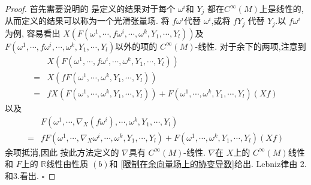 \documentclass[../../几何与拓扑.tex]{subfiles}
\begin{document}
\begin{proof}
    首先需要说明的 是定义的结果对于每个 \(   \omega ^{i}  \)和 \(  Y_{j}  \)  都在\(  C^{\infty}\left( M \right)   \)上是线性的,从而定义的结果可以称为一个光滑张量场.
    将 \(  f \omega ^{i}  \)代替 \(   \omega ^{i}  \),或将 \(  fY_{j}  \)    代替 \(  Y_{j}  \).以  \(  f \omega ^{i}  \)为例,
    容易看出 \(  X\left( F\left(  \omega ^{1},\cdots ,f \omega ^{i},\cdots , \omega ^{k},  Y_1,\cdots,Y_l  \right)  \right)   \)及 \(  F\left(  \omega ^{1},\cdots ,f \omega ^{i},\cdots , \omega ^{k}, Y_1,\cdots,Y_l  \right)   \)以外的项的 \(  C^{\infty}\left( M \right)   \)-线性.
    对于余下的两项,注意到 \[
  \begin{aligned}
   & X\left( F\left(  \omega ^{1},\cdots ,f  \omega ^{i},\cdots , \omega ^{k},  Y_1,\cdots,Y_l  \right)  \right) \\ 
     =  & X\left( f F \left(  \omega^1,\cdots,\omega^k , Y_1,\cdots,Y_l  \right)  \right)\\ 
      = & fX\left( F\left(  \omega^1,\cdots,\omega^k , Y_1,\cdots,Y_l  \right)  \right)+   F\left(  \omega^1,\cdots,\omega^k , Y_1,\cdots,Y_l  \right)\left( Xf \right)    
  \end{aligned} 
    \]  以及 \[
    \begin{aligned}
    & F\left(  \omega ^{1},\cdots , \nabla _{X}\left( f  \omega ^{i} \right) ,\cdots , \omega ^{k}, Y_1,\cdots,Y_l  \right)  \\ 
     =  & f F \left(  \omega ^{1},\cdots ,  \nabla _{X} \omega ^{i},\cdots , \omega ^{k}, Y_1,\cdots,Y_l  \right)+ F\left(   \omega^1,\cdots,\omega^k , Y_1,\cdots,Y_l  \right)\left( Xf \right)   
    \end{aligned}
    \] 余项抵消,因此 按此方法定义的 \(   \nabla   \)具有 \(  C^{\infty}\left( M \right)   \)-线性.
      \(   \nabla   \)在 \(  X  \)上的 \(  C^{\infty}\left( M \right)   \)线性和 \(  F  \)上的 \(  \mathbb{R}   \)线性由性质 \(  \left( b \right)   \)和 \ref{限制在余向量场上的协变导数}给出.
      Lebniz律由 2.和3.看出.       
    \hfill $\square$
\end{proof}
\end{document}

